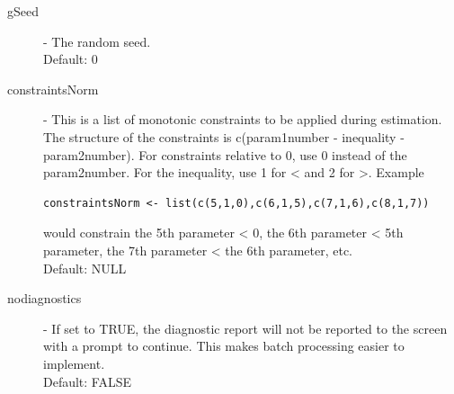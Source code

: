 \documentclass{article}
\begin{document}
\begin{description}
\item[gSeed] - The random seed.\\ 
Default: 0

\item[constraintsNorm] - This is a list of monotonic constraints to be applied during estimation. The structure of the constraints is c(param1number - inequality - param2number). For constraints relative to 0, use 0 instead of the param2number. For the inequality, use 1 for < and 2 for >. Example \begin{verbatim}constraintsNorm <- list(c(5,1,0),c(6,1,5),c(7,1,6),c(8,1,7))\end{verbatim} would constrain the 5th parameter < 0, the 6th parameter < 5th parameter, the 7th parameter < the 6th parameter, etc. \\ Default: NULL

\item[nodiagnostics] - If set to TRUE, the diagnostic report will not be reported to the screen with a prompt to continue. This makes batch processing easier to implement.\\ 
Default: FALSE

\end{description}     
\end{document}
